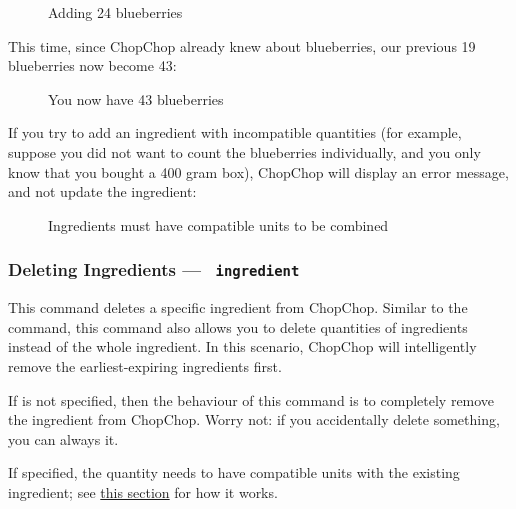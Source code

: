 	\begin{figure}[!htbp]\centering\ContinuedFloat
		\caption{Adding 24 blueberries}
	\end{figure}
	\vspace{-1.5em} %

	This time, since ChopChop already knew about blueberries, our previous 19 blueberries now become 43:

	\begin{figure}[!htbp]\centering\ContinuedFloat
		\caption{You now have 43 blueberries}
	\end{figure}

	If you try to add an ingredient with incompatible quantities (for example, suppose you did not want to count the blueberries
	individually, and you only know that you bought a 400 gram box), ChopChop will display an error message,
	and not update the ingredient:

	\begin{figure}[!htbp]\centering\ContinuedFloat
		\caption{Ingredients must have compatible units to be combined}
	\end{figure}












\hypertarget{DeleteIngredientCommand}{}
\subsubsection{Deleting Ingredients — \texttt{ ingredient}}

	This command deletes a specific ingredient from ChopChop. Similar to the  command, this command also allows
	you to delete quantities of ingredients instead of the whole ingredient. In this scenario, ChopChop will intelligently remove the
	earliest-expiring ingredients first.

	If  is not specified, then the behaviour of this command is to completely remove the ingredient from ChopChop.
	Worry not: if you accidentally delete something, you can always \hyperlink{UndoCommand}{} it.

	\begin{infobox}
		\info{}\hspace{.6em}\parbox{0.9\textwidth}{%
			 If specified, the quantity needs to have compatible units with the existing ingredient;
			see \hyperlink{QuantitiesAndUnits}{this section} for how it works.
		}
	\end{infobox}

